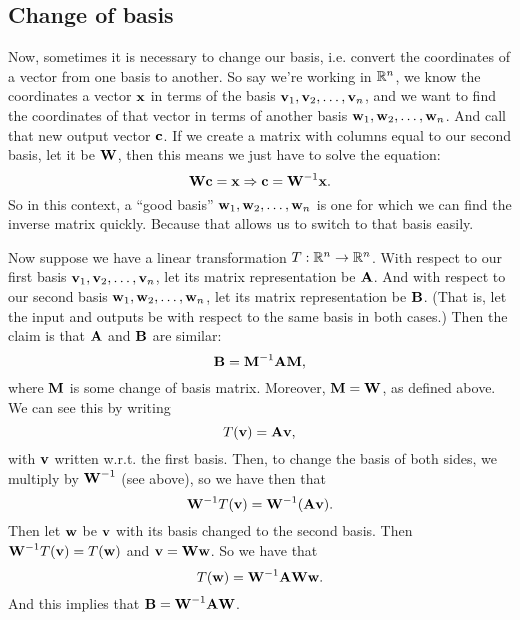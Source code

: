 \subsection{Change of basis}

Now, sometimes it is necessary to change our basis, i.e. convert the coordinates of a vector from one basis to another. So say we're working in $\RR^n$, we know the coordinates a vector $\vx$ in terms of the basis $\vv_1,\vv_2, \ldots, \vv_n$, and we want to find the coordinates of that vector in terms of another basis $\vw_1,\vw_2, \ldots, \vw_n$. And call that new output vector $\vc$. If we create a matrix with columns equal to our second basis, let it be $\mW$, then this means we just have to solve the equation:
\[ \mW\vc = \vx \Rightarrow \vc = \mW^{-1}\vx. \]
So in this context, a ``good basis'' $\vw_1,\vw_2, \ldots, \vw_n$ is one for which we can find the inverse matrix quickly. Because that allows us to switch to that basis easily.

Now suppose we have a linear transformation $T:\RR^n\to\RR^n$. With respect to our first basis $\vv_1,\vv_2, \ldots, \vv_n$, let its matrix representation be $\mA$. And with respect to our second basis $\vw_1,\vw_2, \ldots, \vw_n$, let its matrix representation be $\mB$. (That is, let the input and outputs be with respect to the same basis in both cases.) Then the claim is that $\mA$ and $\mB$ are similar:
\[ \mB = \mM^{-1} \mA \mM, \]
where $\mM$ is some change of basis matrix. Moreover, $\mM = \mW$, as defined above. We can see this by writing
\[ T(\vv) = \mA \vv, \]
with $\vv$ written w.r.t. the first basis. Then, to change the basis of both sides, we multiply by $\mW^{-1}$ (see above), so we have then that
\[ \mW^{-1} T(\vv) = \mW^{-1} (\mA \vv). \]
Then let $\vw$ be $\vv$ with its basis changed to the second basis. Then $\mW^{-1} T(\vv)= T(\vw)$ and $\vv = \mW \vw$. So we have that
\[ T(\vw) = \mW^{-1} \mA \mW \vw. \]
And this implies that $\mB = \mW^{-1} \mA \mW$.